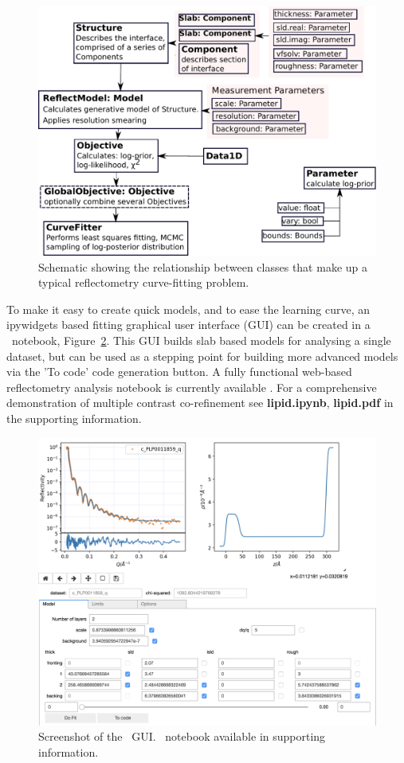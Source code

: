 \documentclass[12pt]{article}
\begin{document}
\begin{figure}
  \includegraphics[width=\linewidth]{components}
  \caption{Schematic showing the relationship between classes that make up a typical reflectometry curve-fitting problem.}
  \label{fig:components}
\end{figure}

To make it easy to create quick models, and to ease the learning curve, an ipywidgets \cite{ipywidgets} based fitting graphical user interface (GUI) can be created in a \Jupyter\ notebook, Figure~\ref{fig:gui}. This GUI builds slab based models for analysing a single dataset, but can be used as a stepping point for building more advanced models via the 'To code' code generation button. A fully functional web-based reflectometry analysis notebook is currently available \cite{Nelson2018}. For a comprehensive demonstration of multiple contrast co-refinement see \textbf{lipid.ipynb}, \textbf{lipid.pdf} in the supporting information.

\begin{figure}
  \includegraphics[width=\linewidth]{./supporting_information/gui.png}
  \caption{Screenshot of the \Jupyter\/\ipywidgets\ GUI. \Jupyter\ notebook available in supporting information.}
  \label{fig:gui}
\end{figure}
\end{document}
